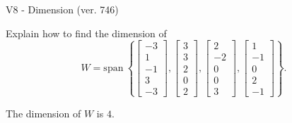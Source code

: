 \begin{exercise}
  \begin{exerciseTitle}V8 - Dimension (ver. 746)\end{exerciseTitle}
  \begin{exerciseStatement}
    Explain how to find the dimension of 
\[W=\mathrm{span}\ \left\{\left[\begin{array}{r}
-3 \\
1 \\
-1 \\
3 \\
-3
\end{array}\right] , \left[\begin{array}{r}
3 \\
3 \\
2 \\
0 \\
2
\end{array}\right] , \left[\begin{array}{r}
2 \\
-2 \\
0 \\
0 \\
3
\end{array}\right] , \left[\begin{array}{r}
1 \\
-1 \\
0 \\
2 \\
-1
\end{array}\right]\right\}.\]



  \end{exerciseStatement}
  \begin{exerciseAnswer}
   The dimension of \(W\) is  \(4\).
  


  \end{exerciseAnswer}
\end{exercise}